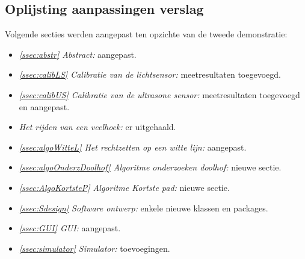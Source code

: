 \documentclass[tt3]{penoverslag}
\begin{document}
\subsection{Oplijsting aanpassingen verslag} %
\label{Assec:aanp2}
Volgende secties werden aangepast ten opzichte van de tweede demonstratie:

\begin{itemize}

\item \textit{\ref{ssec:abstr} Abstract:} aangepast.
\item \textit{\ref{ssec:calibLS} Calibratie van de lichtsensor:} meetresultaten toegevoegd.
\item \textit{\ref{ssec:calibUS} Calibratie van de ultrasone sensor:} meetresultaten toegevoegd en aangepast.
\item \textit{ Het rijden van een veelhoek:} er uitgehaald.
\item \textit{\ref{ssec:algoWitteL} Het rechtzetten op een witte lijn:} aangepast.
\item \textit{\ref{ssec:algoOnderzDoolhof} Algoritme onderzoeken doolhof:} nieuwe sectie.
\item \textit{\ref{ssec:AlgoKortsteP} Algoritme Kortste pad:} nieuwe sectie.
\item \textit{\ref{ssec:Sdesign} Software ontwerp:} enkele nieuwe klassen en packages.
\item \textit{\ref{ssec:GUI} GUI:} aangepast.
\item \textit{\ref{ssec:simulator} Simulator:} toevoegingen.
\end{itemize}




\end{document}
